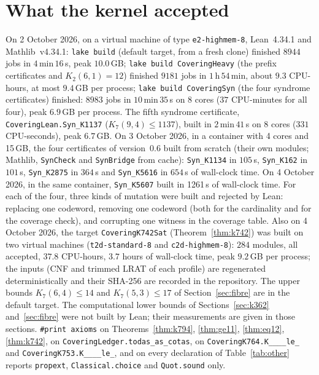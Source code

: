 \documentclass[11pt]{amsart}
\theoremstyle{definition}
\theoremstyle{remark}
\begin{document}
\section{What the kernel accepted}
On 2 October 2026, on a virtual machine of type \texttt{e2-highmem-8}, Lean~4.34.1 and Mathlib~v4.34.1:
\texttt{lake build} (default target, from a fresh clone) finished $8944$ jobs in $4$\,min\,$16$\,s, peak $10.0$\,GB;
\texttt{lake build CoveringHeavy} (the prefix certificates and $K_2(6,1)=12$) finished $9181$ jobs in $1$\,h\,$54$\,min, about $9.3$ CPU-hours, at most $9.4$\,GB per process;
\texttt{lake build CoveringSyn} (the four syndrome certificates) finished: $8983$ jobs in $10$\,min\,$35$\,s on 8 cores ($37$ CPU-minutes for all four), peak $6.9$\,GB per process.
The fifth syndrome certificate, \texttt{CoveringLean.\allowbreak Syn\_\allowbreak K1137} ($K_7(9,4)\le 1137$), built in $2$\,min\,$41$\,s on 8 cores ($331$ CPU-seconds), peak $6.7$\,GB.
On 3 October 2026, in a container with 4 cores and 15\,GB, the four certificates of version~0.6 built from scratch (their own modules; Mathlib, \texttt{SynCheck} and \texttt{SynBridge} from cache): \texttt{Syn\_\allowbreak K1134} in $105$\,s, \texttt{Syn\_\allowbreak K162} in $101$\,s, \texttt{Syn\_\allowbreak K2875} in $364$\,s and \texttt{Syn\_\allowbreak K5616} in $654$\,s of wall-clock time.
On 4 October 2026, in the same container, \texttt{Syn\_\allowbreak K5607} built in 1261\,s of wall-clock time.
For each of the four, three kinds of mutation were built and rejected by Lean: replacing one codeword, removing one codeword (both for the cardinality and for the coverage check), and corrupting one witness in the coverage table.
Also on 4 October 2026, the target \texttt{CoveringK742Sat} (Theorem~\ref{thm:k742}) was built on two virtual machines (\texttt{t2d-standard-8} and \texttt{c2d-highmem-8}): $284$ modules, all accepted, $37.8$ CPU-hours, $3.7$ hours of wall-clock time, peak $9.2$\,GB per process; the inputs (CNF and trimmed LRAT of each profile) are regenerated deterministically and their SHA-256 are recorded in the repository.
The upper bounds $K_7(6,4)\le 14$ and $K_7(5,3)\le 17$ of Section~\ref{sec:fibre} are in the default target.
The computational lower bounds of Sections~\ref{sec:k362} and~\ref{sec:fibre} were not built by Lean; their measurements are given in those sections.
\texttt{\#print axioms} on Theorems~\ref{thm:k794}, \ref{thm:ge11}, \ref{thm:eq12}, \ref{thm:k742}, on \texttt{CoveringLedger.\allowbreak todas\_\allowbreak as\_\allowbreak cotas}, on \texttt{CoveringK764.\allowbreak K\_\_\_\_\allowbreak le\_} and \texttt{CoveringK753.\allowbreak K\_\_\_\_\allowbreak le\_}, and on every declaration of Table~\ref{tab:other} reports \texttt{propext}, \texttt{Classical.\allowbreak choice} and \texttt{Quot.\allowbreak sound} only.
\end{document}
